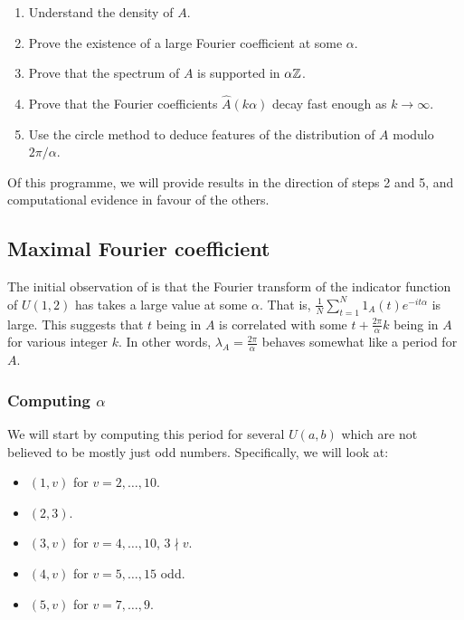 \documentclass{article}
\theoremstyle{definition}
\theoremstyle{remark}
\numberwithin{equation}{section}
\begin{document}
\begin{enumerate}
  \item Understand the density of $A$.
  \item Prove the existence of a large Fourier coefficient at
    some $\alpha$.
  \item Prove that the spectrum of $A$ is supported in $\alpha \mathbb{Z}$.  
  \item Prove that the Fourier coefficients $\widehat{A}(k\alpha)$
    decay fast enough as $k \to \infty$.  
  \item Use the circle method to deduce features of the distribution
    of $A$ modulo $2\pi/\alpha$.
\end{enumerate}

Of this programme, we will provide results in the direction of steps 2
and 5, and computational evidence in favour of the others.

\subsection{Maximal Fourier coefficient}

The initial observation of \cite{ulam_steinerberger} is that the
Fourier transform of the indicator function of $U(1,2)$ has takes a
large value at some $\alpha$.  That is,
$\frac1N \sum_{t=1}^N 1_A(t) e^{-it\alpha}$ is large.  This suggests
that $t$ being in $A$ is correlated with some
$t+\frac{2\pi}{\alpha} k$ being in $A$ for various integer $k$.  In
other words, $\lambda_A = \frac{2\pi}{\alpha}$ behaves somewhat like a
period for $A$.

\subsubsection{Computing $\alpha$}

We will start by computing this period for several $U(a,b)$ which are
not believed to be mostly just odd numbers.  Specifically, we will
look at: 

\begin{itemize}
\item $(1,v)$ for $v = 2, \ldots, 10$.
\item $(2,3)$.
\item $(3,v)$ for $v = 4, \ldots, 10$, $3 \nmid v$.
\item $(4,v)$ for $v = 5, \ldots, 15$ odd.
\item $(5,v)$ for $v = 7, \ldots, 9$.
\end{itemize}
\end{document}
